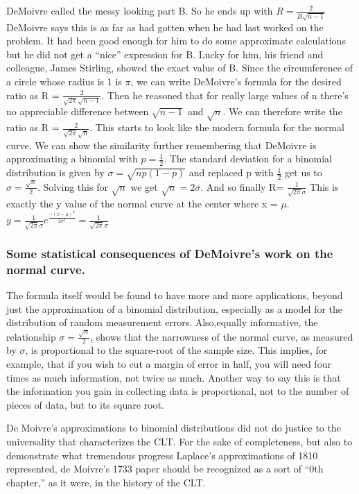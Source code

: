 \documentclass{article}
\begin{document}
DeMoivre called the messy looking part B. So he ends up with $ R= \frac{2}{B \sqrt{n-1}} $
DeMoivre says this is as far as had gotten when he had last worked on the problem.
It had been good enough for him to do some approximate calculations but he did not get a “nice” expression for B.
Lucky for him, his friend and colleague,
James Stirling, showed the exact value of B.
Since the circumference of a circle whose radius is 1 is $ \pi $, we can write DeMoivre’s formula for the desired ratio as R = $ \frac{2}{ \sqrt{2\pi}\sqrt{n-1} } $.
Then he reasoned that for really large values of n there’s no appreciable difference between $ \sqrt{n-1} $ and  $ \sqrt{n}$.
We can therefore write the ratio as  R = $ \frac{2}{ \sqrt{2\pi}\sqrt{n} } $.
This starts to look like the modern formula for the normal curve.
We can show the similarity further remembering that DeMoivre is approximating a binomial with $ p= \frac{1}{2} $. The standard deviation for a binomial distribution is given by $ \sigma = \sqrt{np(1-p)} $ and replaced p with $ \frac{1}{2} $  get us to $ \sigma = \frac{ \sqrt{n}}{2} $.
Solving this for $ \sqrt{n}$ we get $ \sqrt{n}= 2\sigma $.
And so finally R= $ \frac{1}{\sqrt{2\pi}\sigma}$
This is exactly the y value of the normal curve at the center where x = $ \mu $.
$ y= \frac{1}{\sqrt{2\pi}\sigma }e^{{\frac{-(x-\mu)^{2}}{2\sigma^{2}}}}=  \frac{1}{\sqrt{2\pi}\sigma} $

\subsubsection{Some statistical consequences of DeMoivre’s work on the normal curve.}
The formula itself would be found to have more and more applications, beyond just the approximation of a binomial distribution, especially as a model for the distribution of random measurement errors. Also,equally informative, the relationship $ \sigma = \frac{\sqrt{n}}{2}$, shows that the narrowness of the normal curve, as measured by $\sigma$, is proportional to the square-root of the sample size. This implies, for example, that if you wish to cut a margin of error in half, you will need four times as much information, not twice as much. Another way to say this is that the information you gain in collecting data is proportional, not to the number of pieces of data, but to its square root.

De Moivre’s approximations to binomial distributions did not do justice to the universality that characterizes the CLT. For the sake of completeness, but also to demonstrate what tremendous progress Laplace’s approximations of 1810 represented, de Moivre’s 1733 paper should be recognized as a sort of “0th chapter,” as it were, in the history of the CLT.
\end{document}
